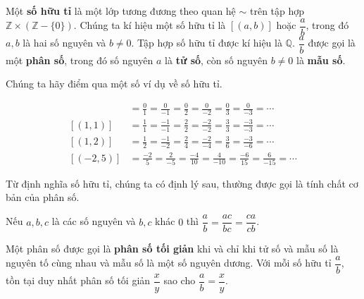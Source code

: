 \begin{definition}
    Một \textbf{số hữu tỉ} là một lớp tương đương theo quan hệ $\sim$ trên tập hợp $\mathbb{Z}\times (\mathbb{Z} - \{0\})$. Chúng ta kí hiệu một số hữu tỉ là $[(a, b)]$ hoặc $\dfrac{a}{b}$, trong đó $a, b$ là hai số nguyên và $b\ne 0$. Tập hợp số hữu tỉ được kí hiệu là $\mathbb{Q}$.  $\dfrac{a}{b}$ được gọi là một \textbf{phân số}, trong đó số nguyên $a$ là \textbf{tử số}, còn số nguyên $b\ne 0$ là \textbf{mẫu số}.
\end{definition}

Chúng ta hãy điểm qua một số ví dụ về số hữu tỉ.
\begin{example}
    \begin{align*}
        [(0, 1)] & = \frac{0}{1} = \frac{0}{-1} = \frac{0}{2} = \frac{0}{-2} = \frac{0}{3} = \frac{0}{-3} = \cdots        \\
        [(1, 1)] & = \frac{1}{1} = \frac{-1}{-1} = \frac{2}{2} = \frac{-2}{-2} = \frac{3}{3} = \frac{-3}{-3} = \cdots     \\
        [(1, 2)] & = \frac{1}{2} = \frac{-1}{-2} = \frac{2}{4} = \frac{-2}{-4} = \frac{3}{6} = \frac{-3}{-6} = \cdots     \\
        [(-2,5)] & = \frac{-2}{5} = \frac{2}{-5} = \frac{-4}{10} = \frac{4}{-10} = \frac{-6}{15} = \frac{6}{-15} = \cdots
    \end{align*}
\end{example}

Từ định nghĩa số hữu tỉ, chúng ta có định lý sau, thường được gọi là tính chất cơ bản của phân số.
\begin{theorem}\label{theorem:fundamental-property-of-fraction}
    Nếu $a, b, c$ là các số nguyên và $b, c$ khác $0$ thì $\dfrac{a}{b} = \dfrac{ac}{bc} = \dfrac{ca}{cb}$.
\end{theorem}

\begin{theorem}
    Một phân số được gọi là \textbf{phân số tối giản} khi và chỉ khi tử số và mẫu số là nguyên tố cùng nhau và mẫu số là một số nguyên dương. Với mỗi số hữu tỉ $\dfrac{a}{b}$, tồn tại duy nhất phân số tối giản $\dfrac{x}{y}$ sao cho $\dfrac{a}{b} = \dfrac{x}{y}$.
\end{theorem}

